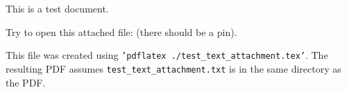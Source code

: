 \documentclass{article}
\begin{document}
This is a test document.

Try to open this attached file:  (there should be a pin).

This file was created using \texttt{'pdflatex ./test\_text\_attachment.tex'}. The resulting PDF assumes \texttt{test\_text\_attachment.txt} is in the same directory as the PDF.
\end{document}

